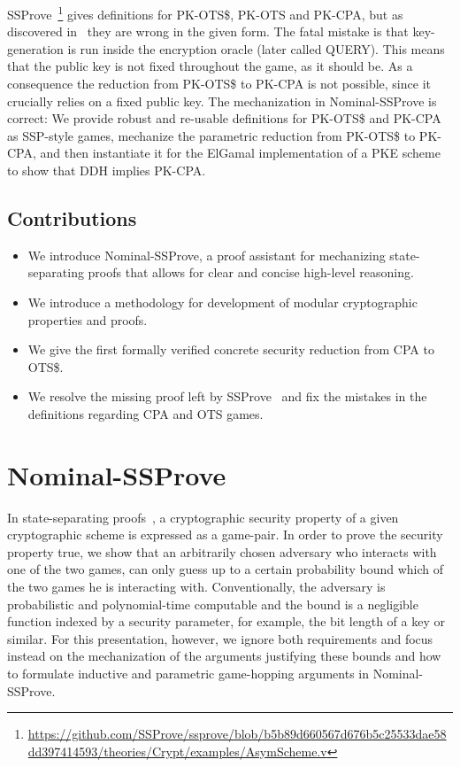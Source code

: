 \documentclass[a4paper,USenglish,cleveref, autoref]{lipics-v2021}
\newcommand{\NSSP}{Nominal-SSProve\xspace}
\begin{document}
SSProve~\cite{haselwarter23popl}\footnote{\url{https://github.com/SSProve/ssprove/blob/b5b89d660567d676b5c25533dae58dd397414593/theories/Crypt/examples/AsymScheme.v}} gives definitions for PK-OTS\$, PK-OTS and PK-CPA,
but as discovered in~\cite{nssp-preprint} they are wrong in the given form.
The fatal mistake is that key-generation is run inside the encryption oracle (later called QUERY). This
means that the public key is not fixed throughout the game, as it should be. As a consequence the reduction
from PK-OTS\$ to PK-CPA is not possible, since it crucially relies on a fixed public key. The mechanization in \NSSP is correct: We provide robust and re-usable definitions for PK-OTS\$ and PK-CPA as SSP-style
games, mechanize the parametric reduction from PK-OTS\$ to PK-CPA, and then instantiate it for the ElGamal implementation of a PKE scheme to show that DDH implies PK-CPA.

\subsection{Contributions}\label{sec:contrib}

\begin{itemize}
    \item We introduce Nominal-SSProve, a proof assistant for mechanizing state-separating proofs that allows for clear and concise high-level reasoning.
    \item We introduce a methodology for development of modular cryptographic properties and proofs.
    \item We give the first formally verified concrete security reduction from CPA to OTS\$.
    \item We resolve the missing proof left by SSProve~\cite{haselwarter23popl} and fix the mistakes in the definitions regarding CPA and OTS games.
\end{itemize}


\section{Nominal-SSProve} \label{sec:nominalSSProve}

In state-separating proofs~\cite{brzuska18asiacrypt}, a cryptographic security property of a given cryptographic scheme is expressed as a game-pair. In order to prove the security property true, we show that an arbitrarily chosen adversary who interacts with one of the two games, can only guess up to  a certain probability bound which of the two games he is interacting with. Conventionally, the adversary is probabilistic and polynomial-time computable and the bound is a negligible function indexed by a security parameter, for example, the bit length of a key or similar. For this presentation, however, we ignore both requirements and focus instead on the mechanization of the arguments justifying these bounds and how to formulate inductive and parametric game-hopping arguments in \NSSP.
\end{document}
